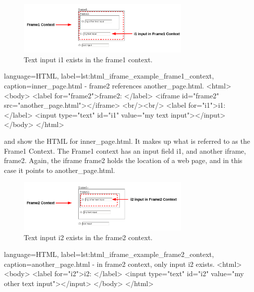 \begin{figure}[tbh]
  \centering
  \includegraphics[width=0.75\textwidth]
    {../../images/iframewrap_inputs_example_frame_1.png}
  \caption{Text input i1 exists in the frame1 context.}
  \label{fig:iframewrap_inputs_example_frame_1}
\end{figure}

\begin{xcode}{%
  language=HTML,%
  label=lst:html_iframe_example_frame1_context,%
  caption={inner\_page.html - frame2 references another\_page.html.}%
}
<html>
    <body>
        <label for="frame2">frame2: </label>
        <iframe id="frame2" src="another_page.html"></iframe>
        <br/><br/>
        <label for="i1">i1: </label>
        <input type="text" id="i1" value="my text input"></input>
    </body>
</html>
\end{xcode}

 and
 show the HTML for
inner\_page.html.  It makes up what is referred to as the Frame1 Context. The
Frame1 context has an input field i1, and another iframe, frame2.  Again, the
iframe frame2 holds the location of a web page, and in this case it points to
another\_page.html.


\begin{figure}[tbh]
  \centering
  \includegraphics[width=0.75\textwidth]
    {../../images/iframewrap_inputs_example_frame_2.png}
  \caption{Text input i2 exists in the frame2 context.}
  \label{fig:iframewrap_inputs_example_frame_2}
\end{figure}

\begin{xcode}{%
  language=HTML,%
  label=lst:html_iframe_example_frame2_context,%
  caption={another\_page.html - in frame2 context, only input i2 exists.}%
}
<html>
    <body>
        <label for="i2">i2: </label>
        <input type="text" id="i2" value="my other text input"></input>
    </body>
</html>
\end{xcode}


